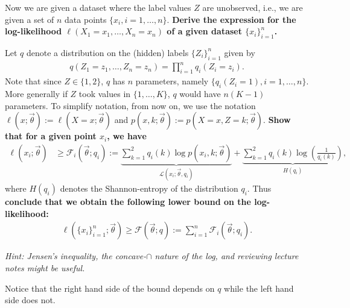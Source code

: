 \documentclass[preview]{standalone}
\begin{document}
\begin{Parts}


\Part Now we are given a dataset where the label values $Z$ are unobserved, i.e., we are given a
set of $n$ data points $\{x_i, i=1, \ldots, n\}$.
{\bf Derive the expression for the log-likelihood 
$\ell(X_1= x_1, \ldots, X_n=x_n)$ of a given dataset $\{{x}_i\}_{i=1}^n$.}

\Part Let $q$ denote a distribution on the (hidden) labels $\{Z_i\}_{i=1}^n$ given by
\begin{align}
  q(Z_1 = z_1, \ldots, Z_n = z_n) = \prod_{i=1}^n q_i(Z_i=z_i). \label{eq:q}
\end{align}
Note that since $Z \in\{1, 2\}$, $q$ has $n$ parameters, namely $\{q_i(Z_i=1), i=1, \ldots, n\}$.
More generally if $Z$ took values in $\{1, \ldots, K\}$, $q$ would have $n(K-1)$ parameters.
To simplify notation, from now on, we use the notation $\ell(x; \vec{\theta}) := \ell({X} = {x}; \vec{\theta})$
and $ p(x, k; \vec\theta) := p(X=x, Z=k; \vec\theta)$.
{\bf Show that for a given point $x_i$, we have }
\begin{align}
  \ell(x_i; \vec{\theta})
  &\geq \mathcal{F}_i(\vec{\theta}; q_i)
  :=\underbrace{\sum_{k=1}^2 q_i(k) \log p (x_i, k; \vec{\theta})}_{\mathcal{L}(x_i; \vec\theta, q_i)} + \underbrace{\sum_{k=1}^2 {q}_i(k) \log\left(\frac{1}{{q}_i(k)}\right)}_{H(q_i)}, 
  \label{eq:lower_bound}
\end{align}
where $H({q}_i)$ denotes the Shannon-entropy of the distribution
$q_i$. 
Thus {\bf conclude that we obtain the following lower bound on the log-likelihood:}
\begin{align}
  \ell(\{x_i\}_{i=1}^n; \vec\theta)  \geq 
  \mathcal{F}(\vec{\theta}; q) := \sum_{i=1}^n\mathcal{F}_i(\vec{\theta}; {q}_i).
  \label{eq:F_defn}
\end{align}

{\em Hint: Jensen's inequality, the concave-$\cap$ nature of the log,
  and reviewing lecture notes might be useful.} 

Notice that the right hand side of the bound depends on $q$ while the  
left hand side does not.


\end{Parts}
\end{document}

